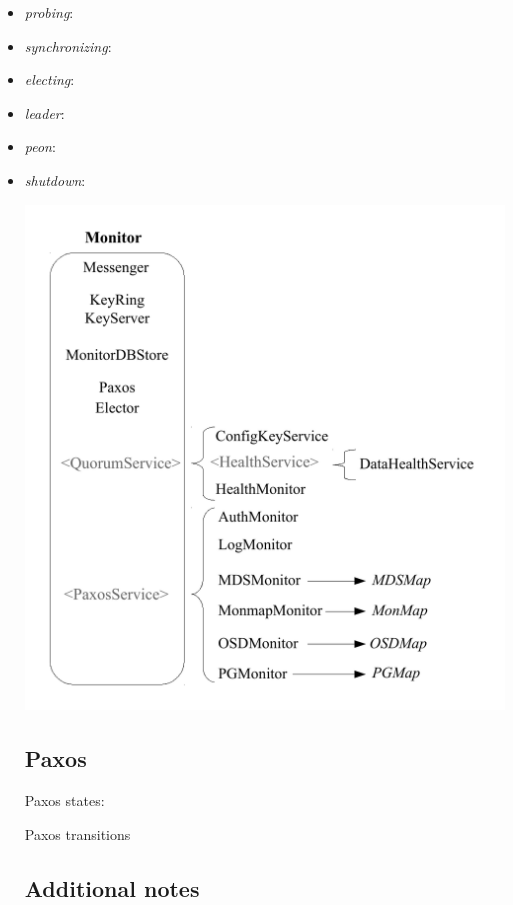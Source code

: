 \documentclass{article}
\begin{document}
\begin{itemize}

\item \textit{probing}:
\item \textit{synchronizing}:
\item \textit{electing}:
\item \textit{leader}:
\item \textit{peon}:
\item \textit{shutdown}:




\begin{center}
	\includegraphics[scale=0.50]{figs/class_dia.pdf}
	\label{fig:monclass}
\end{center}


\subsection{Paxos}

Paxos states:


Paxos transitions


\subsection{Additional notes}


\end{itemize}
\end{document}
